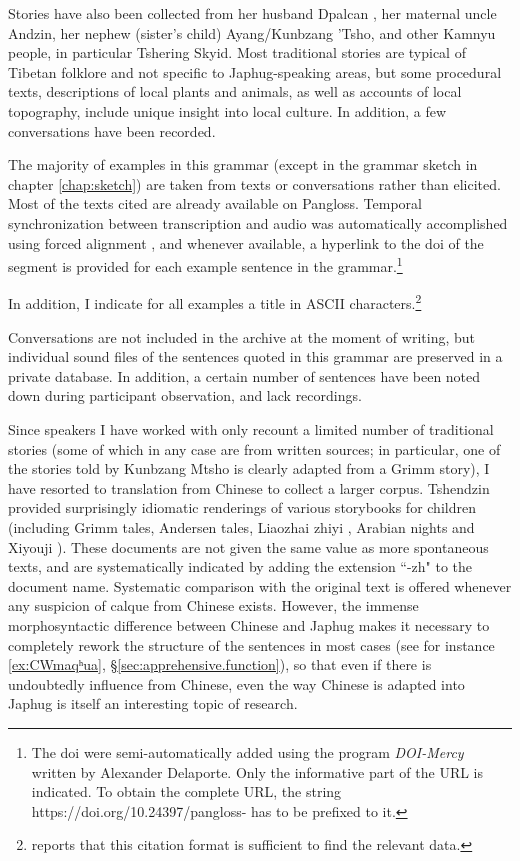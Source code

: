 Stories  have also been collected from her husband  Dpalcan , her maternal uncle Andzin, her nephew (sister's child) Ayang/Kunbzang 'Tsho, and other Kamnyu people, in particular  Tshering Skyid. Most traditional stories are typical of Tibetan folklore and not specific to Japhug-speaking areas, but some procedural texts, descriptions of local plants and animals, as well as accounts of local topography, include unique insight into local culture. In addition, a few conversations have been recorded.
 
The majority of examples in this grammar (except in the grammar sketch in chapter \ref{chap:sketch}) are taken from texts or conversations rather than elicited. Most of the texts cited are already available on Pangloss. 
Temporal synchronization between transcription and audio was automatically accomplished using forced alignment \citep{macaire20alignement}, and whenever available, a hyperlink to the doi of the segment \citep{vasile20doi}  is provided for each example sentence in the grammar.\footnote{The doi were semi-automatically added using the program \textit{DOI-Mercy} written by Alexander Delaporte. Only the informative part of the URL is indicated. To obtain the complete URL, the string {https://doi.org/10.24397/pangloss-} has to be prefixed to it. }

In addition, I indicate for all examples a title in ASCII characters.\footnote{ \citet[305]{hill17statest} reports that this citation format is sufficient to find the relevant data. }

Conversations are not included in the archive at the moment of writing, but individual sound files of the sentences quoted in this grammar are preserved in a private database. In addition, a certain number of sentences have been noted down during participant observation, and lack recordings.
 
Since speakers I have worked with only recount a limited number of traditional stories (some of which in any case are from written sources; in particular, one of the stories told by Kunbzang Mtsho is clearly adapted from a Grimm story), I have resorted to translation from Chinese to collect a larger corpus. Tshendzin provided surprisingly idiomatic renderings of various storybooks for children (including Grimm tales, Andersen tales, Liaozhai zhiyi , Arabian nights and Xiyouji ). These documents are not given the same value as more spontaneous texts, and are systematically indicated  by adding the extension ``-zh" to the document name. Systematic comparison with the original text is offered whenever any suspicion of calque from Chinese exists. However, the immense morphosyntactic difference between Chinese and Japhug makes it necessary to completely rework the structure of the sentences in most cases (see for instance \ref{ex:CWmaqʰua}, §\ref{sec:apprehensive.function}), so that even if there is undoubtedly influence from Chinese, even the way Chinese is adapted into Japhug is itself an interesting topic of research.

